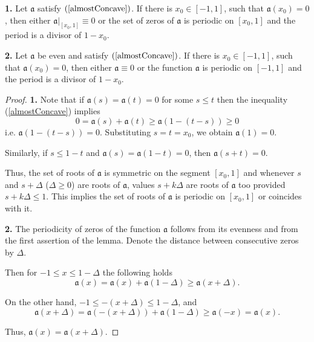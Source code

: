 \begin{lm}
\label{periodicity}
{\bf 1.} Let $\mathfrak a$ satisfy $(\ref{almostConcave})$.
If there is $x_0 \in [-1, 1]$, such that $\mathfrak a(x_0) = 0$,
then either $\mathfrak a \Big|_{[x_0, 1]} \equiv 0$
or the set of zeros of $\mathfrak a$ is periodic on $[x_0, 1]$
and the period is a divisor of $1 - x_0$.

{\bf 2.} Let $\mathfrak a$ be even and satisfy $(\ref{almostConcave})$.
If there is $x_0 \in [-1, 1]$, such that $\mathfrak a(x_0) = 0$,
then either $\mathfrak a \equiv 0$
or the function $\mathfrak a$ is periodic on $[-1, 1]$
and the period is a divisor of $1 - x_0$.
\end{lm}

\begin{proof}
{\bf 1.}
Note that if $\mathfrak a(s) = \mathfrak a(t) = 0$ for some $s \le t$
then the inequality (\ref{almostConcave}) implies
$$0 = \mathfrak a(s) + \mathfrak a(t) \ge \mathfrak a( 1 - (t - s) ) \ge 0$$
i.e. $\mathfrak a(1 - (t - s)) = 0$.
Substituting $s = t = x_0$, we obtain $\mathfrak a(1) = 0$.

Similarly, if $s \le 1 - t$ and $\mathfrak a(s) = \mathfrak a(1 - t) = 0$, then $\mathfrak a(s + t) = 0$.

Thus, the set of roots of $\mathfrak a$ is symmetric on the segment $[x_0, 1]$ and
whenever $s$ and $s + \Delta$ ($\Delta \ge 0$) are roots of $\mathfrak a$,
values $s + k\Delta$ are roots of $\mathfrak a$ too provided $s + k\Delta \le 1$.
This implies the set of roots of $\mathfrak a$ is periodic on $[x_0, 1]$
or coincides with it.

{\bf 2.} The periodicity of zeros of the function $\mathfrak a$ follows from its evenness and from the first assertion of the lemma.
Denote the distance between consecutive zeros by $\Delta$.

Then for $-1 \le x \le 1 - \Delta$ the following holds
$$\mathfrak a(x) = \mathfrak a(x) + \mathfrak a(1 - \Delta) \ge \mathfrak a(x + \Delta).$$

On the other hand, $-1 \le -(x + \Delta) \le 1 - \Delta$, and
$$\mathfrak a(x + \Delta) = \mathfrak a(-(x + \Delta)) + \mathfrak a(1 - \Delta) \ge \mathfrak a(-x) = \mathfrak a(x).$$

Thus, $\mathfrak a(x) = \mathfrak a(x + \Delta)$.
\end{proof}

